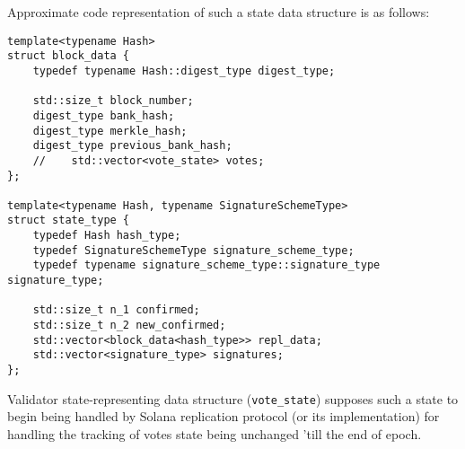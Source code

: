 Approximate code representation of such a state data structure is as follows:
\begin{lstlisting}[frame=single]
template<typename Hash>
struct block_data {
    typedef typename Hash::digest_type digest_type;

    std::size_t block_number;
    digest_type bank_hash;
    digest_type merkle_hash;
    digest_type previous_bank_hash;
    //    std::vector<vote_state> votes;
};

template<typename Hash, typename SignatureSchemeType>
struct state_type {
    typedef Hash hash_type;
    typedef SignatureSchemeType signature_scheme_type;
    typedef typename signature_scheme_type::signature_type signature_type;

    std::size_t n_1 confirmed;
    std::size_t n_2 new_confirmed;
    std::vector<block_data<hash_type>> repl_data;
    std::vector<signature_type> signatures;
};
\end{lstlisting}

Validator state-representing data structure (\texttt{vote\_state}) supposes such
a state to begin being handled by Solana replication protocol (or its
implementation) for handling the tracking of votes state being unchanged 'till
the end of epoch.












